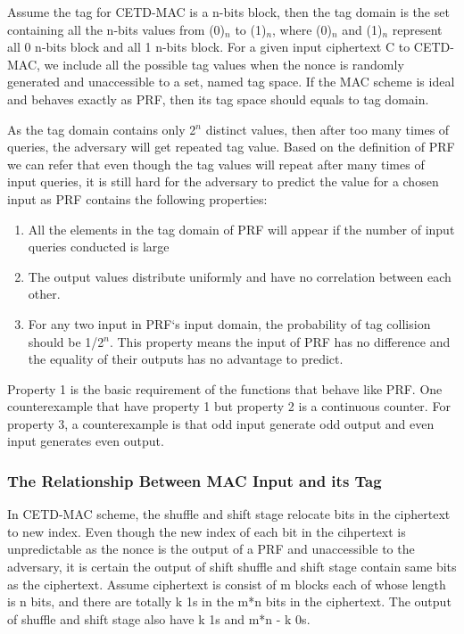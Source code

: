  Assume the tag for CETD-MAC is a n-bits block, then the tag domain is the set containing all the n-bits values from (0)$_n$ to (1)$_n$, where (0)$_n$ and (1)$_n$ represent all 0 n-bits block and all 1 n-bits block. For a given input ciphertext C to CETD-MAC, we include all the possible tag values when the nonce is randomly generated and unaccessible to a set, named tag space. If the MAC scheme is ideal and behaves exactly as PRF, then its tag space should equals to tag domain.

As the tag domain contains only 2$^n$ distinct values, then after too many times of queries, the adversary will get repeated tag value. Based on the definition of PRF we can refer that even though the tag values will repeat after many times of input queries, it is still hard for the adversary to predict the value for a chosen input as PRF contains the following properties:
\begin{enumerate}
	\item All the elements in the tag domain of PRF will appear if the number of input queries conducted is large
	\item The output values distribute uniformly and have no correlation between each other. 
	\item For any two input in PRF`s input domain, the probability of tag collision should be 1/2$^n$. This property means the input of PRF has no difference and the equality of their outputs has no advantage to predict.
\end{enumerate}
Property 1 is the basic requirement of the functions that behave like PRF. One
counterexample that have property 1 but property 2 is a continuous counter.
For property 3, a counterexample is that odd input generate odd output and even input generates even output.

\subsubsection{The Relationship Between MAC Input and its Tag}
\label{sect:bit-proportion}
In CETD-MAC scheme, the shuffle and shift stage relocate bits in the ciphertext to new index. Even though the new index of each bit in the cihpertext is unpredictable as the nonce is the output of a PRF and unaccessible to the adversary, it is certain the output of shift shuffle and shift stage contain same bits as the ciphertext. Assume ciphertext is consist of m blocks each of whose length is n bits, and there are totally k 1s in the m*n bits in the ciphertext. The output of shuffle and shift stage also have k 1s and m*n - k 0s. 


